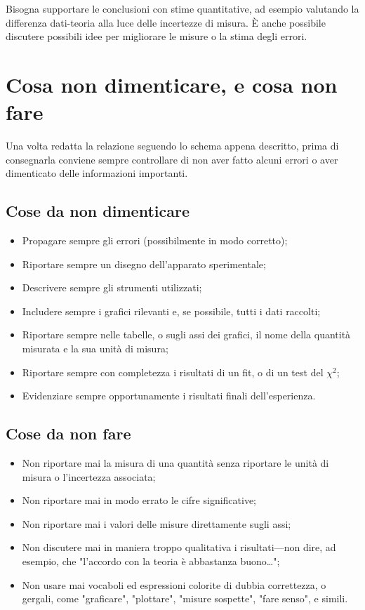 Bisogna supportare le conclusioni con stime quantitative, ad esempio valutando
la differenza dati-teoria alla luce delle incertezze di misura. \`E anche
possibile discutere possibili idee per migliorare le misure o la stima degli
errori.


\section{Cosa non dimenticare, e cosa non fare}
\label{sec:relazione_daevitare}

Una volta redatta la relazione seguendo lo schema appena descritto, prima di
consegnarla conviene sempre controllare di non aver fatto alcuni errori o
aver dimenticato delle informazioni importanti.


\subsection{Cose da non dimenticare}

\begin{itemize}
\item Propagare sempre gli errori (possibilmente in modo corretto);
\item Riportare sempre un disegno dell'apparato sperimentale;
\item Descrivere sempre gli strumenti utilizzati;
\item Includere sempre i grafici rilevanti e, se possibile, tutti i dati
  raccolti;
\item Riportare sempre nelle tabelle, o sugli assi dei grafici, il nome della
  quantità misurata e la sua unità di misura;
\item Riportare sempre con completezza i risultati di un fit, o di un test del
  $\chi^{2}$;
\item Evidenziare sempre opportunamente i risultati finali dell'esperienza.
\end{itemize}


\subsection{Cose da non fare}

\begin{itemize}
\item Non riportare mai la misura di una quantità senza riportare le unità
  di misura o l'incertezza associata;
\item Non riportare mai in modo errato le cifre significative;
\item Non riportare mai i valori delle misure direttamente sugli assi;
\item Non discutere mai in maniera troppo qualitativa i risultati---non dire,
  ad esempio, che "l'accordo con la teoria è abbastanza buono\ldots";
\item Non usare mai vocaboli ed espressioni colorite di dubbia correttezza,
  o gergali, come "graficare", "plottare", "misure sospette", "fare senso", e
  simili.
\end{itemize}


